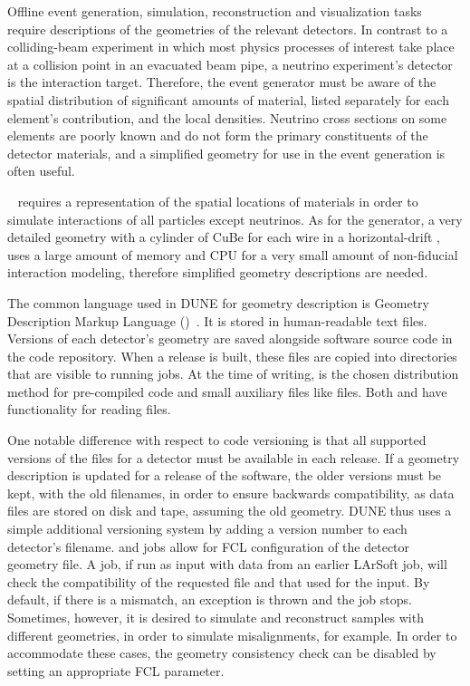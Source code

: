 \documentclass[../main-v1.tex]{subfiles}
\begin{document}
Offline event generation, simulation, reconstruction and visualization tasks require descriptions of the geometries of the relevant detectors.  In contrast to a colliding-beam experiment in which most physics processes of interest take place at a collision point in an evacuated beam pipe, a neutrino experiment's detector is the interaction target.  Therefore, the event generator must be aware of the spatial distribution of significant amounts of material, listed separately for each element's contribution, and the local densities.  Neutrino cross sections on some elements are poorly known and do not form the primary constituents of the detector materials, and a simplified geometry for use in the event generation is often useful.

~\cite{geant4} requires a representation of the spatial locations of materials in order to simulate interactions of all particles except neutrinos.  As for the generator, a very detailed geometry with a cylinder of CuBe for each wire in a horizontal-drift , uses a large amount of memory and CPU for a very small amount of non-fiducial interaction modeling, therefore %
simplified geometry descriptions are needed.

The common language used in DUNE for geometry description is Geometry Description Markup Language ()~\cite{gdml}.  It is stored in human-readable text files.  Versions of each detector's geometry are saved alongside software source code in the code repository.  When a release is built, these  files are copied into directories that are visible to running jobs.  At the time of writing,  is the chosen distribution method for pre-compiled code and small auxiliary files like  files.   Both  and  have functionality for reading  files.

One notable difference with respect to code versioning is that all supported versions of the  files for a detector must be available in each release.  If a geometry description is updated for a release of the software, the older versions must be kept, with the old  filenames, in order to ensure backwards compatibility, as data files are stored on disk and tape, assuming the old geometry.  DUNE thus uses a simple additional versioning system by adding a version number to each detector's  filename.   and   jobs allow for FCL 
configuration of the detector geometry  file.  A   job, if run as input with data from an earlier LArSoft job, will check the compatibility of the requested  file and that used for the input.  By default, if there is a mismatch, an exception is thrown and the job stops.  Sometimes, however, it is desired to simulate and reconstruct  samples with different geometries, in order to simulate misalignments, for example.  In order to accommodate these cases, the geometry consistency check can be disabled by setting an appropriate FCL  parameter.
\end{document}
